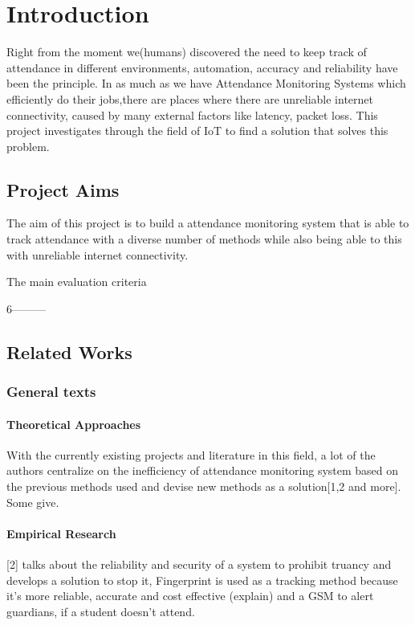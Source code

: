 \chapter{Introduction}
Right from the moment we(humans) discovered the need to keep track of attendance in different environments, automation, accuracy and reliability have been the principle. In as much as we have Attendance Monitoring Systems which efficiently do their jobs,there are places where there are unreliable internet connectivity, caused by many external factors like latency, packet loss. This project investigates through the field of IoT to find a solution that solves this problem.


\section{Project Aims}

The aim of this project is to build a attendance monitoring system that is able to track attendance with a diverse number of methods while also being able to this with unreliable internet connectivity. 

The main evaluation criteria




6---------

\section{Related Works} 

\subsection{General texts}

\subsubsection{Theoretical Approaches}
With the currently existing projects and literature in this field, a lot of the authors centralize on the inefficiency of attendance monitoring system based on the previous methods used and devise new methods as a solution[1,2 and more]. Some give.

\subsubsection{Empirical Research}
[2] talks about the reliability and security of a system to prohibit truancy and develops a solution to stop it, Fingerprint is used as a tracking method because it's more reliable, accurate and cost effective (explain) and a GSM to alert guardians, if a student doesn't attend.

